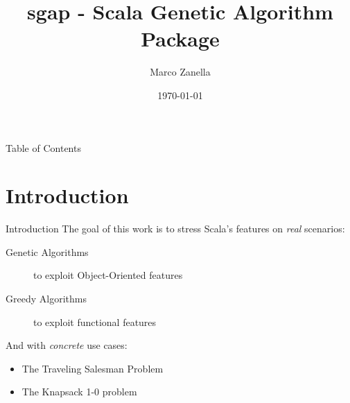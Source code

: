 \documentclass{beamer}
\title[sgap]{sgap - Scala Genetic Algorithm Package}
\author{Marco Zanella}
\institute[University of Padova]{
 University of Padova \\
 \medskip
 {\emph{marco.zanella.9@studenti.unipd.it}}
}
\date{\today}
\begin{document}
\begin{frame}
\titlepage
\end{frame}


\begin{frame}{Table of Contents}
\tableofcontents
\end{frame}



\section{Introduction}
\begin{frame}{Introduction}
  The goal of this work is to stress Scala's features on \emph{real} scenarios:
  \begin{description}
    \item [Genetic Algorithms] to exploit Object-Oriented features
    \item [Greedy Algorithms] to exploit functional features
  \end{description}
  And with \emph{concrete} use cases:
  \begin{itemize}
    \item The Traveling Salesman Problem
    \item The Knapsack 1-0 problem
  \end{itemize}
\end{frame}


\end{document}
